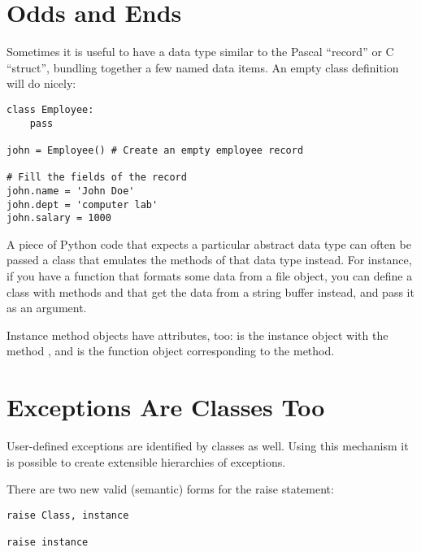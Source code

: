 \documentclass{manual}
\begin{document}
\section{Odds and Ends \label{odds}}

Sometimes it is useful to have a data type similar to the Pascal
``record'' or C ``struct'', bundling together a few named data
items.  An empty class definition will do nicely:

\begin{verbatim}
class Employee:
    pass

john = Employee() # Create an empty employee record

# Fill the fields of the record
john.name = 'John Doe'
john.dept = 'computer lab'
john.salary = 1000
\end{verbatim}

A piece of Python code that expects a particular abstract data type
can often be passed a class that emulates the methods of that data
type instead.  For instance, if you have a function that formats some
data from a file object, you can define a class with methods
 and  that get the data from a string
buffer instead, and pass it as an argument.%


Instance method objects have attributes, too:  is the
instance object with the method , and  is the
function object corresponding to the method.


\section{Exceptions Are Classes Too\label{exceptionClasses}}

User-defined exceptions are identified by classes as well.  Using this
mechanism it is possible to create extensible hierarchies of exceptions.

There are two new valid (semantic) forms for the raise statement:

\begin{verbatim}
raise Class, instance

raise instance
\end{verbatim}
\end{document}
